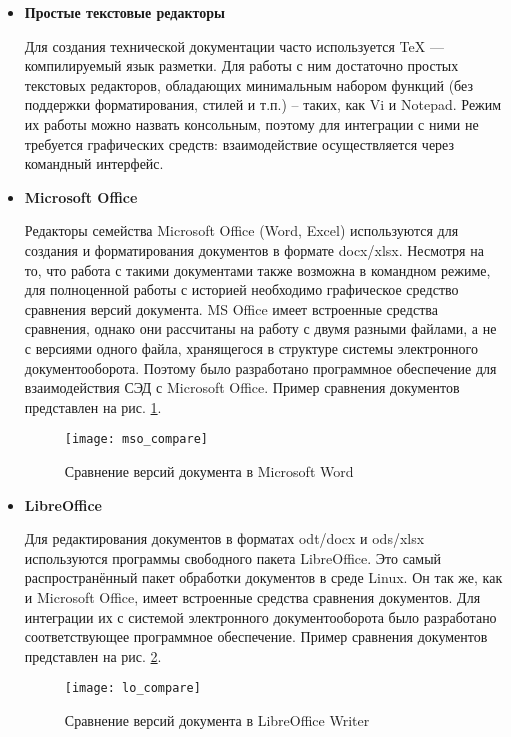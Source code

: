 \begin{itemize}[label=\textbf{---} ]
	
	\item \textbf{Простые текстовые редакторы}

	Для создания технической документации часто используется TeX --- компилируемый язык разметки. Для работы с ним достаточно простых текстовых редакторов, обладающих минимальным набором функций (без поддержки форматирования, стилей и т.п.) -- таких, как Vi и Notepad. Режим их работы можно назвать консольным, поэтому для интеграции с ними не требуется графических средств: взаимодействие осуществляется через командный интерфейс.
	
	\item \textbf{Microsoft Office}

	Редакторы семейства Microsoft Office (Word, Excel) используются для создания и форматирования документов в формате docx/xlsx. Несмотря на то, что работа с такими документами также возможна в командном режиме, для полноценной работы с историей необходимо графическое средство сравнения версий документа. MS Office имеет встроенные средства сравнения, однако они рассчитаны на работу с двумя разными файлами, а не с версиями одного файла, хранящегося в структуре системы электронного документооборота. Поэтому было разработано программное обеспечение для взаимодействия СЭД с Microsoft Office. Пример сравнения документов представлен на рис. \ref{img:mso_compare}.
	\begin{figure}[h!]
		\centering
		\texttt{[image: mso\_compare]}
		\caption{Сравнение версий документа в Microsoft Word}
		\label{img:mso_compare}
	\end{figure}

	\item \textbf{LibreOffice}

	Для редактирования документов в форматах odt/docx и ods/xlsx используются программы свободного пакета LibreOffice. Это самый распространённый пакет обработки документов в среде Linux. Он так же, как и Microsoft Office, имеет встроенные средства сравнения документов. Для интеграции их с системой электронного документооборота было разработано соответствующее программное обеспечение. Пример сравнения документов представлен на рис. \ref{img:lo_compare}.
	\begin{figure}[h!]
		\centering
		\texttt{[image: lo\_compare]}
		\caption{Сравнение версий документа в LibreOffice Writer}
		\label{img:lo_compare}
	\end{figure}
\end{itemize}

